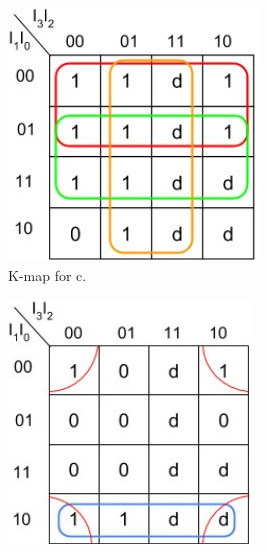\documentclass{article}
\begin{document}
\begin{figure}[h!]
  \begin{mdframed}
  \centering
  \begin{subfigure}[b]{0.3\linewidth}
    \includegraphics[width=\linewidth]{c_kmap.jpg}
    \caption{K-map for c.}
  \end{subfigure}
  \begin{subfigure}[b]{0.3\linewidth}
    \includegraphics[width=\linewidth]{e_kmap.jpg}

\end{subfigure}
\end{mdframed}
\end{figure}
\end{document}
